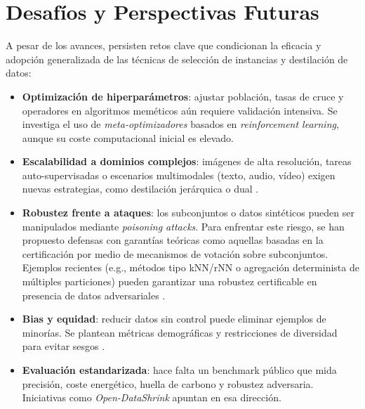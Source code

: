\section{Desafíos y Perspectivas Futuras}
A pesar de los avances, persisten retos clave que condicionan la eficacia y adopción generalizada de las técnicas de selección de instancias y destilación de datos:

\begin{itemize}
    \item \textbf{Optimización de hiperparámetros}: ajustar población, tasas de cruce y operadores en algoritmos meméticos aún requiere validación intensiva.
          Se investiga el uso de \textit{meta-optimizadores} basados en \textit{reinforcement learning}, aunque su coste computacional inicial es elevado.

    \item \textbf{Escalabilidad a dominios complejos}: imágenes de alta resolución, tareas auto-supervisadas o escenarios multimodales (texto, audio, vídeo) exigen nuevas estrategias, como destilación jerárquica o dual \cite{https://arxiv.org/abs/2404.17732, https://openaccess.thecvf.com/content/CVPR2024W/DDCV/html/Li_Generative_Dataset_Distillation_Balancing_Global_Structure_and_Local_Details_CVPRW_2024_paper.html}.

    \item \textbf{Robustez frente a ataques}: los subconjuntos o datos sintéticos pueden ser manipulados mediante \textit{poisoning attacks}.
    Para enfrentar este riesgo, se han propuesto defensas con garantías teóricas como aquellas basadas en la certificación por medio de mecanismos de votación sobre subconjuntos.
    Ejemplos recientes (e.g., métodos tipo kNN/rNN o agregación determinista de múltiples particiones) pueden garantizar una robustez certificable en presencia de datos adversariales \cite{https://arxiv.org/abs/2012.03765, https://arxiv.org/abs/2202.02628}.

    \item \textbf{Bias y equidad}: reducir datos sin control puede eliminar ejemplos de minorías.
          Se plantean métricas demográficas y restricciones de diversidad para evitar sesgos \cite{https://scispace.com/papers/gender-shades-intersectional-accuracy-disparities-in-4qgeu0c1i3}.

    \item \textbf{Evaluación estandarizada}: hace falta un benchmark público que mida precisión, coste energético, huella de carbono y robustez adversaria.
          Iniciativas como \textit{Open-DataShrink} apuntan en esa dirección.


\end{itemize}
